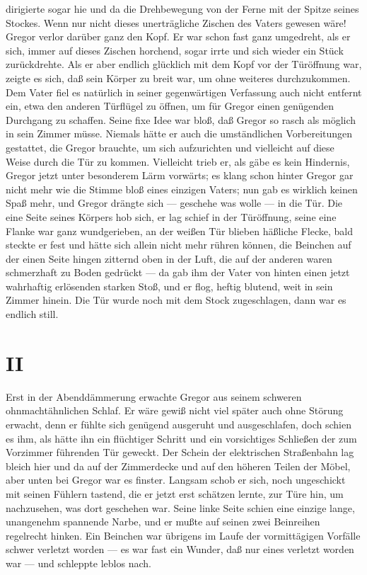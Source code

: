 dirigierte sogar hie und da die Drehbewegung von der Ferne mit der
Spitze seines Stockes. Wenn nur nicht dieses unerträgliche Zischen des
Vaters gewesen wäre! Gregor verlor darüber ganz den Kopf. Er war schon
fast ganz umgedreht, als er sich, immer auf dieses Zischen horchend,
sogar irrte und sich wieder ein Stück zurückdrehte. Als er aber endlich
glücklich mit dem Kopf vor der Türöffnung war, zeigte es sich, daß sein
Körper zu breit war, um ohne weiteres durchzukommen. Dem Vater fiel es
natürlich in seiner gegenwärtigen Verfassung auch nicht entfernt ein,
etwa den anderen Türflügel zu öffnen, um für Gregor einen genügenden
Durchgang zu schaffen. Seine fixe Idee war bloß, daß Gregor so rasch als
möglich in sein Zimmer müsse. Niemals hätte er auch die umständlichen
Vorbereitungen gestattet, die Gregor brauchte, um sich aufzurichten und
vielleicht auf diese Weise durch die Tür zu kommen. Vielleicht trieb er,
als gäbe es kein Hindernis, Gregor jetzt unter besonderem Lärm
vorwärts; es klang schon hinter Gregor gar nicht mehr wie die Stimme
bloß eines einzigen Vaters; nun gab es wirklich keinen Spaß mehr, und
Gregor drängte sich --- geschehe was wolle --- in die Tür. Die eine Seite
seines Körpers hob sich, er lag schief in der Türöffnung, seine eine
Flanke war ganz wundgerieben, an der weißen Tür blieben häßliche Flecke,
bald steckte er fest und hätte sich allein nicht mehr rühren können, die
Beinchen auf der einen Seite hingen zitternd oben in der Luft, die auf
der anderen waren schmerzhaft zu Boden gedrückt --- da gab ihm der Vater
von hinten einen jetzt wahrhaftig erlösenden starken Stoß, und er flog,
heftig blutend, weit in sein Zimmer hinein. Die Tür wurde noch mit dem
Stock zugeschlagen, dann war es endlich still.

\pagebreak

\vspace*{2.5cm}

\section{II}

\noindent{}Erst in der Abenddämmerung erwachte Gregor aus seinem schweren
ohnmachtähnlichen Schlaf. Er wäre gewiß nicht viel später auch ohne
Störung erwacht, denn er fühlte sich genügend ausgeruht und
ausgeschlafen, doch schien es ihm, als hätte ihn ein flüchtiger Schritt
und ein vorsichtiges Schließen der zum Vorzimmer führenden Tür geweckt.
Der Schein der elektrischen Straßenbahn lag bleich hier und da auf der
Zimmerdecke und auf den höheren Teilen der Möbel, aber unten bei Gregor
war es finster. Langsam schob er sich, noch ungeschickt mit seinen
Fühlern tastend, die er jetzt erst schätzen lernte, zur Türe hin, um
nachzusehen, was dort geschehen war. Seine linke Seite schien eine
einzige lange, unangenehm spannende Narbe, und er mußte auf seinen zwei
Beinreihen regelrecht hinken. Ein Beinchen war übrigens im Laufe der
vormittägigen Vorfälle schwer verletzt worden --- es war fast ein
Wunder, daß nur eines verletzt worden war --- und schleppte leblos nach.

